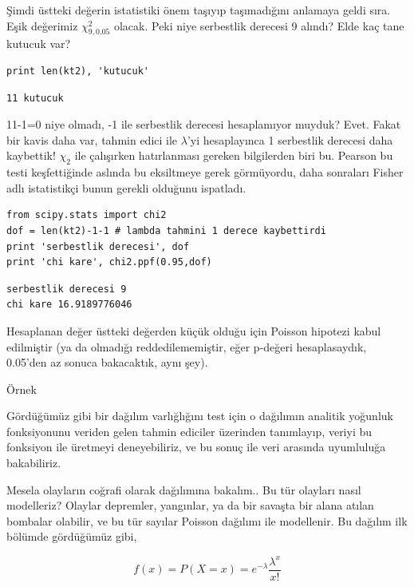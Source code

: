 \documentclass[12pt,fleqn]{article}\usepackage{../../common}
\begin{document}
Şimdi üstteki değerin istatistiki önem taşıyıp taşımadığını anlamaya geldi
sıra. Eşik değerimiz $\chi^2_{9,0.05}$ olacak. Peki niye serbestlik
derecesi 9 alındı? Elde kaç tane kutucuk var? 

\begin{verbatim}
print len(kt2), 'kutucuk'
\end{verbatim}

\begin{verbatim}
11 kutucuk
\end{verbatim}

11-1=0 niye olmadı, -1 ile serbestlik derecesi hesaplamıyor muyduk?
Evet. Fakat bir kavis daha var, tahmin edici ile $\lambda$'yi hesaplayınca
1 serbestlik derecesi daha kaybettik! $\chi_2$ ile çalışırken hatırlanması
gereken bilgilerden biri bu. Pearson bu testi keşfettiğinde aslında bu
eksiltmeye gerek görmüyordu, daha sonraları Fisher adlı istatistikçi bunun
gerekli olduğunu ispatladı.

\begin{verbatim}
from scipy.stats import chi2
dof = len(kt2)-1-1 # lambda tahmini 1 derece kaybettirdi
print 'serbestlik derecesi', dof
print 'chi kare', chi2.ppf(0.95,dof)
\end{verbatim}

\begin{verbatim}
serbestlik derecesi 9
chi kare 16.9189776046
\end{verbatim}

Hesaplanan değer üstteki değerden küçük olduğu için Poisson hipotezi kabul
edilmiştir (ya da olmadığı reddedilememiştir, eğer p-değeri hesaplasaydık,
0.05'den az sonuca bakacaktık, aynı şey). 

Örnek

Gördüğümüz gibi bir dağılım varlığlığını test için o dağılımın analitik yoğunluk
fonksiyonunu veriden gelen tahmin ediciler üzerinden tanımlayıp, veriyi bu
fonksiyon ile üretmeyi deneyebiliriz, ve bu sonuç ile veri arasında uyumluluğa
bakabiliriz.

Mesela olayların coğrafi olarak dağılımına bakalım..  Bu tür olayları nasıl
modelleriz? Olaylar depremler, yangınlar, ya da bir savaşta bir alana atılan
bombalar olabilir, ve bu tür sayılar Poisson dağılımı ile modellenir. Bu dağılım
ilk bölümde gördüğümüz gibi,

$$ f(x) = P(X=x) = e^{-\lambda}\frac{\lambda^{x}}{x!} $$
\end{document}
